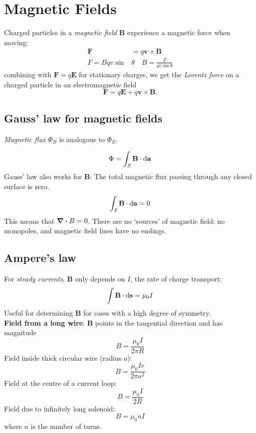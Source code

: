 \section{Magnetic Fields}
Charged particles in a \textit{magnetic field} $\mathbf{B}$ experience a magnetic force when moving:
\begin{equation*}
    \begin{aligned}
        \mathbf{F}\ &= q\mathbf{v} \times \mathbf{B} \\
        F = Bqv\sin &\theta \quad B = \frac{F}{qv\sin \theta}
    \end{aligned}
\end{equation*}
combining with $\mathbf{F} = q \mathbf{E}$ for stationary charges, we get the \textit{Lorentz force}
on a charged particle in an electromagnetic field
\begin{equation*}
    \mathbf{F} = q \mathbf{E} + q\mathbf{v} \times \mathbf{B}.
\end{equation*}
\subsection*{Gauss' law for magnetic fields}
\textit{Magnetic flux} $\Phi_B$ is analogous to $\Phi_E$.

\begin{equation*}
    \Phi = \int_S \mathbf{B} \cdot \differential \mathbf{a}
\end{equation*}
Gauss' law also works for $\mathbf{B}$: The total magnetic flux passing through any closed surface is zero.
\begin{equation*}
    \int_S \mathbf{B} \cdot \differential \mathbf{a} = 0
\end{equation*}
This means that $\divergence B = 0$. There are no `sources' of magnetic field: no monopoles, and magnetic field lines have no endings.

\subsection*{Ampere's law}
For \textit{steady currents}, $\mathbf{B}$ only depends on $I$, the rate of charge transport:
\begin{equation*}
    \int \mathbf{B} \cdot \differential \mathbf{s} = \mu_0 I
\end{equation*}
Useful for determining $\mathbf{B}$ for cases with a high degree of symmetry. \\
\textbf{Field from a long wire}: $\mathbf{B}$ points in the tangential direction and has magnitude
\begin{equation*}
    B = \frac{\mu_0 I}{2\pi R}
\end{equation*}
Field inside thick circular wire (radius $a$):
\begin{equation*}
    B = \frac{\mu_0 Ir}{2\pi a^2}
\end{equation*}
Field at the centre of a current loop:
\begin{equation*}
    B = \frac{\mu_0 I}{2R}
\end{equation*}
Field due to infinitely long solenoid:
\begin{equation*}
    B = \mu_0nI
\end{equation*}
where $n$ is the number of turns.

